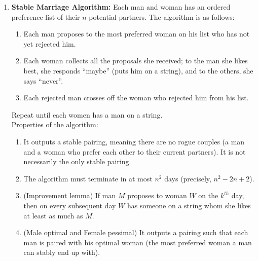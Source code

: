 \documentclass[10pt]{article}
\begin{document}
\begin{multicols}{2}
\begin{enumerate}
    \item \textbf{Stable Marriage Algorithm:} Each man and woman has an ordered preference list of their $n$ potential partners. The algorithm is as follows: 
    \begin{enumerate}
        \item Each man proposes to the most preferred woman on his list who has not yet rejected him.
        \item Each woman collects all the proposals she received; to the man she likes best, she responds “maybe” (puts him on a string), and to the others, she says “never”.
        \item Each rejected man crosses off the woman who rejected him from his list.
    \end{enumerate}
    Repeat until each women has a man on a string. \\
    Properties of the algorithm:
    \begin{enumerate}
        \item It outputs a stable pairing, meaning there are no rogue couples (a man and a woman who prefer each other to their current partners). It is not necessarily the only stable pairing.
        \item The algorithm must terminate in at most $n^2$ days (precisely, $n^2-2n+2$).
        \item (Improvement lemma) If man $M$ proposes to woman $W$ on the $k^{th}$ day, then on every subsequent day $W$ has someone on a string whom she likes at least as much as $M$.
        \item (Male optimal and Female pessimal) It outputs a pairing such that each man is paired with his optimal woman (the most preferred woman a man can stably end up with). 
    \end{enumerate}
    

\end{enumerate}
\end{multicols}
\end{document}
